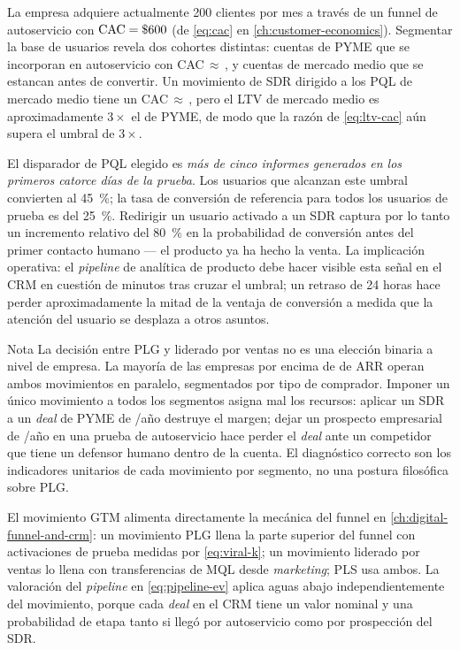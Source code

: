\begin{example}
La empresa adquiere actualmente \num{200} clientes por mes a través de un funnel de autoservicio
con \(\text{CAC} = \$\num{600}\) (de \cref{eq:cac} en \cref{ch:customer-economics}).
Segmentar la base de usuarios revela dos cohortes distintas: cuentas de PYME que se incorporan en
autoservicio con CAC\,\(\approx\)\,, y cuentas de mercado medio que se estancan antes
de convertir. Un movimiento de SDR dirigido a los PQL de mercado medio tiene un
CAC\,\(\approx\)\,, pero el LTV de mercado medio es aproximadamente \(3\times\) el de
PYME, de modo que la razón de \cref{eq:ltv-cac} aún supera el umbral de \(3\times\).

El disparador de PQL elegido es \textit{más de cinco informes generados en los primeros catorce
días de la prueba}. Los usuarios que alcanzan este umbral convierten al \qty{45}{\percent}; la
tasa de conversión de referencia para todos los usuarios de prueba es del \qty{25}{\percent}.
Redirigir un usuario activado a un SDR captura por lo tanto un incremento relativo del
\qty{80}{\percent} en la probabilidad de conversión antes del primer contacto humano --- el
producto ya ha hecho la venta. La implicación operativa: el \emph{pipeline} de analítica de
producto debe hacer visible esta señal en el CRM en cuestión de minutos tras cruzar el umbral;
un retraso de 24 horas hace perder aproximadamente la mitad de la ventaja de conversión a medida
que la atención del usuario se desplaza a otros asuntos.
\end{example}

\begin{admonition}{Nota}
La decisión entre PLG y liderado por ventas no es una elección binaria a nivel de empresa. La
mayoría de las empresas por encima de  de ARR operan ambos movimientos en
paralelo, segmentados por tipo de comprador. Imponer un único movimiento a todos los segmentos
asigna mal los recursos: aplicar un SDR a un \emph{deal} de PYME de /año destruye el
margen; dejar un prospecto empresarial de /año en una prueba de autoservicio hace
perder el \emph{deal} ante un competidor que tiene un defensor humano dentro de la cuenta. El
diagnóstico correcto son los indicadores unitarios de cada movimiento por segmento, no una
postura filosófica sobre PLG.
\end{admonition}

El movimiento GTM alimenta directamente la mecánica del funnel en \cref{ch:digital-funnel-and-crm}:
un movimiento PLG llena la parte superior del funnel con activaciones de prueba medidas por
\cref{eq:viral-k}; un movimiento liderado por ventas lo llena con transferencias de MQL desde
\emph{marketing}; PLS usa ambos. La valoración del \emph{pipeline} en \cref{eq:pipeline-ev}
aplica aguas abajo independientemente del movimiento, porque cada \emph{deal} en el CRM tiene un
valor nominal y una probabilidad de etapa tanto si llegó por autoservicio como por prospección del SDR.


